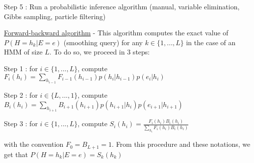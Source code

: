 \documentclass[4pt,landscape]{article}
\begin{document}
\begin{multicols*}{4}
 {\tiny \textrm{Step 5} : Run a probabilistic inference algorithm (manual, variable elimination, Gibbs sampling, particle filtering)}\par
 {\tiny \underline{Forward-backward algorithm} - This algorithm computes the exact value of $P(H = h_k | E = e)$ (smoothing query) for any $k \in \{1, ..., L\}$ in the case of an HMM of size $L$. To do so, we proceed in 3 steps:}\par
 {\tiny \textrm{Step 1} : for $i \in \{1,..., L\}$, compute \\$F_i(h_i) = \sum_{h_{i-1}} F_{i-1}(h_{i-1})p(h_{i}|h_{i-1})p(e_i|h_i)$}\par
 {\tiny \textrm{Step 2} : for $i \in \{L,..., 1\}$, compute \\$B_i(h_i) = \sum_{h_{i+1}} B_{i+1}(h_{i+1})p(h_{i+1}|h_i)p(e_{i+1}|h_{i+1})$}\par
 {\tiny \textrm{Step 3} : for $i \in \{1,...,L\}$, compute $S_i(h_i) = \frac{F_i(h_i)B_i(h_i)}{\sum_{h_i}F_i(h_i)B_i(h_i)}$}\par
 {\tiny with the convention $F_0 = B_{L+1} = 1$. From this procedure and these notations, we get that
 $P(H = h_k | E = e) = S_k(h_k)$}\par
 
 \columnbreak
 

\end{multicols*}
\end{document}
